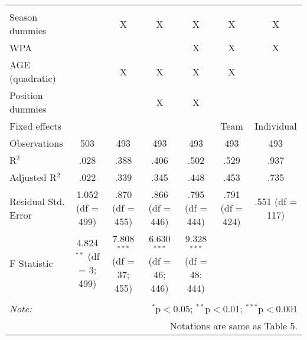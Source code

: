 \begin{table}[H]
\begin{tabular}{@{\extracolsep{5pt}}lcccccc}
  & & & & & & \\
\hline \\[-1.8ex]
Season dummies &  & X & X & X & X & X \\
WPA &  &  &  & X & X & X \\
AGE (quadratic) &  & X & X & X & X &  \\
Position dummies &  &  & X & X &  &  \\
Fixed effects &  &  &  &  & Team & Individual \\
Observations & 503 & 493 & 493 & 493 & 493 & 493 \\
R$^{2}$ & .028 & .388 & .406 & .502 & .529 & .937 \\
Adjusted R$^{2}$ & .022 & .339 & .345 & .448 & .453 & .735 \\
Residual Std. Error & 1.052 (df = 499) & .870 (df = 455) & .866 (df = 446) & .795 (df = 444) & .791 (df = 424) & .551 (df = 117) \\
F Statistic & 4.824$^{**}$ (df = 3; 499) & 7.808$^{***}$ (df = 37; 455) & 6.630$^{***}$ (df = 46; 446) & 9.328$^{***}$ (df = 48; 444) &  &  \\
\hline
\hline \\[-1.8ex]
\textit{Note:}  & \multicolumn{6}{r}{$^{*}$p$<$0.05; $^{**}$p$<$0.01; $^{***}$p$<$0.001} \\
& \multicolumn{6}{r}{Notations are same as Table 5.} \\
\end{tabular}
\end{table}
